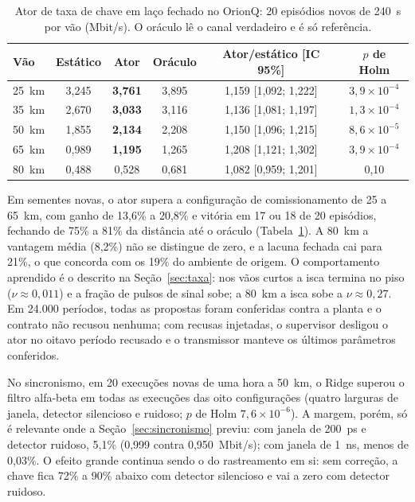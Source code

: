 \documentclass[12pt]{article}
\begin{document}
\begin{table}[ht]
\centering
\caption{Ator de taxa de chave em laço fechado no OrionQ: 20 episódios novos de
240~s por vão (Mbit/s). O oráculo lê o canal verdadeiro e é só referência.}
\label{tab:taxa_lf}
\small
\begin{tabular}{lccccc}
\toprule
Vão & Estático & Ator & Oráculo & Ator/estático [IC 95\%] & $p$ de Holm \\
\midrule
25~km & 3,245 & \textbf{3,761} & 3,895 & 1,159 [1,092; 1,222] & $3{,}9\times10^{-4}$ \\
35~km & 2,670 & \textbf{3,033} & 3,116 & 1,136 [1,081; 1,197] & $1{,}3\times10^{-4}$ \\
50~km & 1,855 & \textbf{2,134} & 2,208 & 1,150 [1,096; 1,215] & $8{,}6\times10^{-5}$ \\
65~km & 0,989 & \textbf{1,195} & 1,265 & 1,208 [1,121; 1,302] & $3{,}9\times10^{-4}$ \\
80~km & 0,488 & 0,528 & 0,681 & 1,082 [0,959; 1,201] & 0,10 \\
\bottomrule
\end{tabular}
\end{table}

Em sementes novas, o ator supera a configuração de comissionamento de 25 a
65~km, com ganho de 13,6\% a 20,8\% e vitória em 17 ou 18 de 20 episódios,
fechando de 75\% a 81\% da distância até o oráculo (Tabela~\ref{tab:taxa_lf}).
A 80~km a vantagem média (8,2\%) não se distingue de zero, e a lacuna fechada
cai para 21\%, o que concorda com os 19\% do ambiente de origem. O
comportamento aprendido é o descrito na Seção~\ref{sec:taxa}: nos vãos curtos a
isca termina no piso ($\nu\approx0{,}011$) e a fração de pulsos de sinal sobe;
a 80~km a isca sobe a $\nu\approx0{,}27$. Em 24.000 períodos, todas as
propostas foram conferidas contra a planta e o contrato não recusou nenhuma; com
recusas injetadas, o supervisor desligou o ator no oitavo período recusado e o
transmissor manteve os últimos parâmetros conferidos.

No sincronismo, em 20 execuções novas de uma hora a 50~km, o Ridge superou o
filtro alfa-beta em todas as execuções das oito configurações (quatro larguras
de janela, detector silencioso e ruidoso; $p$ de Holm $7{,}6\times10^{-6}$).
A margem, porém, só é relevante onde a Seção~\ref{sec:sincronismo} previu: com
janela de 200~ps e detector ruidoso, 5,1\% (0,999 contra 0,950~Mbit/s); com
janela de 1~ns, menos de 0,03\%. O efeito grande continua sendo o do
rastreamento em si: sem correção, a chave fica 72\% a 90\% abaixo com detector
silencioso e vai a zero com detector ruidoso.
\end{document}
